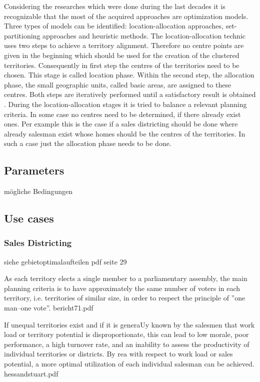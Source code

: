 Considering the researches which were done during the last decades it is recognizable that the most of the acquired approaches are optimization models. Three types of models can be identified: location-allocation approaches, set-partitioning approaches and heuristic methods. The location-allocation technic uses two steps to achieve a territory alignment. Therefore no centre points are given in the beginning which should be used for the creation of the clustered territories. Consequently in first step the centres of the territories need to be chosen. This stage is called location phase. Within the second step, the allocation phase, the small geographic units, called basic areas, are assigned to these centres. Both steps are iteratively performed until a satisfactory result is obtained \cite{kalcsics}. During the location-allocation stages it is tried to balance a relevant planning criteria. In some case no centres need to be determined, if there already exist ones. Per example this is the case if a sales districting should be done where already salesman exist whose homes should be the centres of the territories. In such a case just the allocation phase needs to be done.





\subsection{Parameters}
mögliche Bedingungen


\subsection{Use cases}

\subsubsection{Sales Districting}

siehe gebietoptimalaufteilen pdf seite 29

As each territory elects a single member to a parliamentary assembly, the main
planning criteria is to have approximately the same number of voters in each territory, i.e.
territories of similar size, in order to respect the principle of ”one man–one vote”. bericht71.pdf

If unequal territories exist and if it is generaUy known by the salesmen
that work load or territory potential is disproportionate, this can lead to low morale,
poor performance, a high turnover rate, and an inability to assess the productivity of
individual territories or districts. By rea%
with respect to work load or sales potential, a more optimal utilization of each individual
salesman can be achieved.
hessandstuart.pdf

